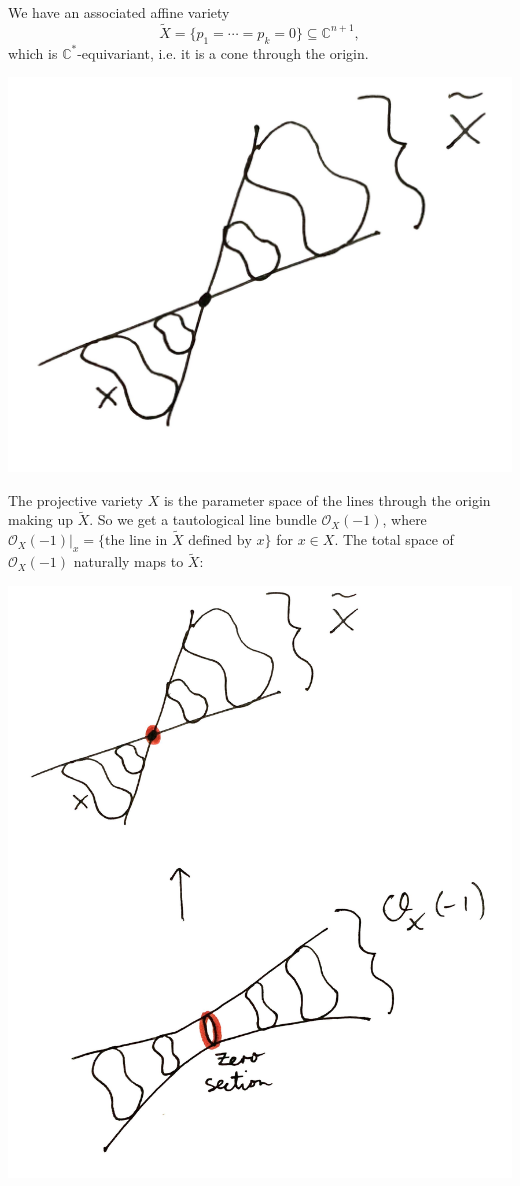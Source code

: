 \documentclass{article}
\theoremstyle{definition}
\renewcommand{\O}{\mathcal{O}}
\newcommand{\C}{\mathbb{C}}
\begin{document}
We have an associated affine variety
\begin{equation*}
    \tilde X = \{p_1=\cdots=p_k=0\} \subseteq \C^{n+1},
\end{equation*}
which is $\C^*$-equivariant, i.e. it is a cone through the origin.
\begin{center}
    \includegraphics[scale=0.1]{git_cone}
\end{center}

The projective variety $X$ is the parameter space of the lines through the
origin making up $\tilde X$. So we get a tautological line bundle $\O_X(-1)$,
where $\O_X(-1)|_x=\{\text{the line in $\tilde X$ defined by $x$}\}$ for
$x\in X$. The total space of $\O_X(-1)$ naturally maps to $\tilde X$:
\begin{center}
    \includegraphics[scale=0.1]{git_blowup}
\end{center}
\end{document}

